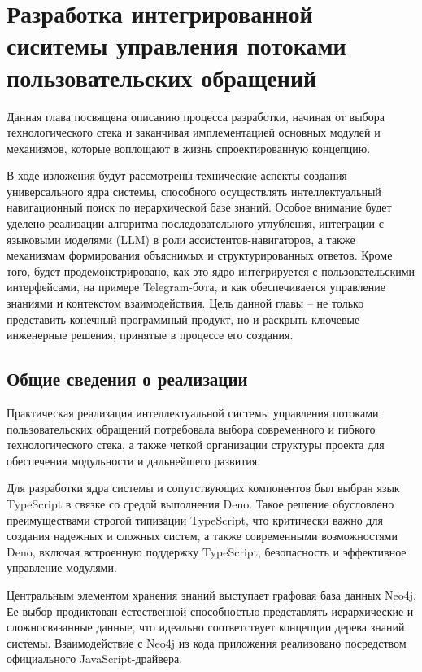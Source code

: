 \section{Разработка интегрированной сиситемы управления потоками пользовательских обращений}
\label{sec:development}

Данная глава посвящена описанию процесса разработки, начиная от выбора технологического стека и заканчивая имплементацией основных модулей и механизмов, которые воплощают в жизнь спроектированную концепцию.

В ходе изложения будут рассмотрены технические аспекты создания универсального ядра системы, способного осуществлять интеллектуальный навигационный поиск по иерархической базе знаний. Особое внимание будет уделено реализации алгоритма последовательного углубления, интеграции с языковыми моделями (LLM) в роли ассистентов-навигаторов, а также механизмам формирования объяснимых и структурированных ответов. Кроме того, будет продемонстрировано, как это ядро интегрируется с пользовательскими интерфейсами, на примере Telegram-бота, и как обеспечивается управление знаниями и контекстом взаимодействия. Цель данной главы – не только представить конечный программный продукт, но и раскрыть ключевые инженерные решения, принятые в процессе его создания.

\subsection{Общие сведения о реализации}

Практическая реализация интеллектуальной системы управления потоками пользовательских обращений потребовала выбора современного и гибкого технологического стека, а также четкой организации структуры проекта для обеспечения модульности и дальнейшего развития.

Для разработки ядра системы и сопутствующих компонентов был выбран язык TypeScript в связке со средой выполнения Deno. Такое решение обусловлено преимуществами строгой типизации TypeScript, что критически важно для создания надежных и сложных систем, а также современными возможностями Deno, включая встроенную поддержку TypeScript, безопасность и эффективное управление модулями.

Центральным элементом хранения знаний выступает графовая база данных Neo4j. Ее выбор продиктован естественной способностью представлять иерархические и сложносвязанные данные, что идеально соответствует концепции дерева знаний системы. Взаимодействие с Neo4j из кода приложения реализовано посредством официального JavaScript-драйвера.

